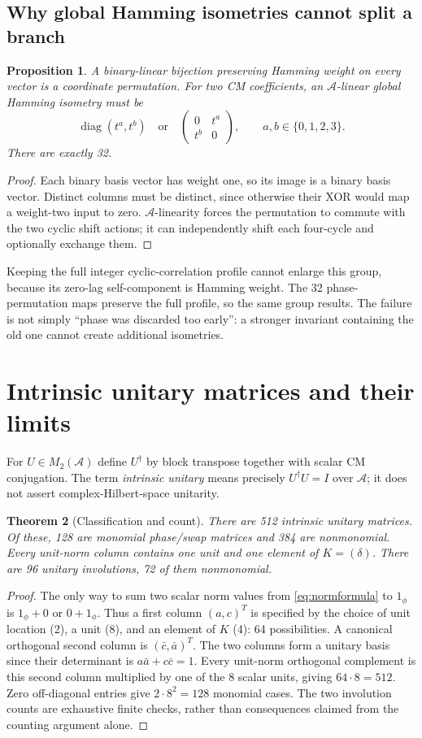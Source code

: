 \documentclass[11pt,a4paper]{article}
\newtheorem{theorem}{Theorem}[section]
\newtheorem{proposition}[theorem]{Proposition}
\theoremstyle{definition}\newtheorem{definition}[theorem]{Definition}
\theoremstyle{remark}\newtheorem{remark}[theorem]{Remark}
\newcommand{\alg}{\mathcal A}
\newcommand{\diag}{\operatorname{diag}}
\newcommand{\cm}[4]{\begin{pmatrix}#1&#2\\#3&#4\end{pmatrix}}
\newcommand{\one}{1_{\phi}}
\numberwithin{equation}{section}
\begin{document}
\subsection{Why global Hamming isometries cannot split a branch}
\begin{proposition}\label{prop:hamming}
A binary-linear bijection preserving Hamming weight on every vector is a coordinate permutation. For two CM coefficients, an $\alg$-linear global Hamming isometry must be
\begin{equation}
 \diag(t^a,t^b)\quad\text{or}\quad
 \cm0{t^a}{t^b}0,\qquad a,b\in\{0,1,2,3\}.
\end{equation}
There are exactly 32.
\end{proposition}
\begin{proof}
Each binary basis vector has weight one, so its image is a binary basis vector. Distinct columns must be distinct, since otherwise their XOR would map a weight-two input to zero. $\alg$-linearity forces the permutation to commute with the two cyclic shift actions; it can independently shift each four-cycle and optionally exchange them.
\end{proof}
Keeping the full integer cyclic-correlation profile cannot enlarge this group, because its zero-lag self-component is Hamming weight. The 32 phase-permutation maps preserve the full profile, so the same group results. The failure is not simply ``phase was discarded too early'': a stronger invariant containing the old one cannot create additional isometries.

\section{Intrinsic unitary matrices and their limits}\label{sec:unitary}
For $U\in M_2(\alg)$ define $U^\dagger$ by block transpose together with scalar CM conjugation. The term \emph{intrinsic unitary} means precisely $U^\dagger U=I$ over $\alg$; it does not assert complex-Hilbert-space unitarity.

\begin{theorem}[Classification and count]\label{thm:unitaries}
There are 512 intrinsic unitary matrices. Of these, 128 are monomial phase/swap matrices and 384 are nonmonomial. Every unit-norm column contains one unit and one element of $K=(\delta)$. There are 96 unitary involutions, 72 of them nonmonomial.
\end{theorem}
\begin{proof}
The only way to sum two scalar norm values from \cref{eq:normformula} to $\one$ is $\one+0$ or $0+\one$. Thus a first column $(a,c)^T$ is specified by the choice of unit location (2), a unit (8), and an element of $K$ (4): 64 possibilities. A canonical orthogonal second column is $(\bar c,\bar a)^T$. The two columns form a unitary basis since their determinant is $a\bar a+c\bar c=1$. Every unit-norm orthogonal complement is this second column multiplied by one of the 8 scalar units, giving $64\cdot8=512$. Zero off-diagonal entries give $2\cdot8^2=128$ monomial cases. The two involution counts are exhaustive finite checks, rather than consequences claimed from the counting argument alone.
\end{proof}
\end{document}
